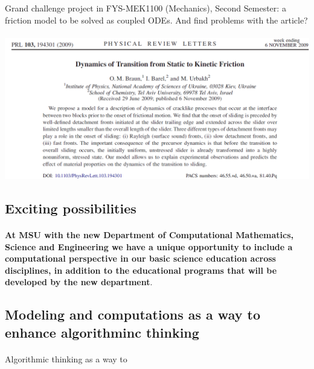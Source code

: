 \documentclass[%
twoside,                 %
final,                   %
10pt]{article}
\begin{document}
Grand challenge project in FYS-MEK1100 (Mechanics), Second Semester: a friction model to be solved as coupled ODEs. And find problems with the article?



\paragraph{}


\centerline{\includegraphics[width=0.5\linewidth]{figures/prl2.png}}




\subsection*{Exciting possibilities}

\paragraph{}

\textbf{At MSU with the new Department of Computational Mathematics, Science and Engineering we have a unique opportunity to include a computational perspective in our basic science education across disciplines, in addition to the educational programs that will be developed by the new department}.




\subsection*{Modeling and computations as a way to enhance algorithminc thinking}

\paragraph{}

Algorithmic  thinking as a way to
\end{document}
